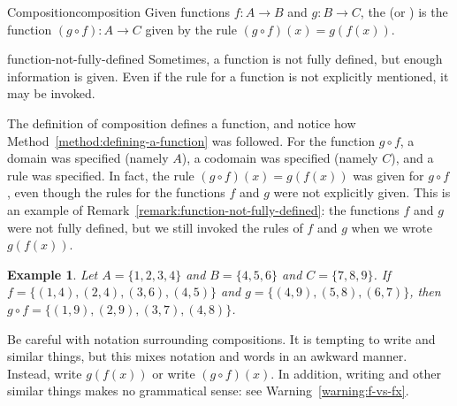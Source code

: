 \documentclass{book}
\newcounter{ekcounter}%
\theoremstyle{ekimcustom}
\newtheorem{example}[ekcounter]{Example}
\newcommand\defn[1]{{\color{blue}{\bf #1}}}
\begin{document}
\begin{bdefinition}{Composition}{composition}
Given functions $f : A \to B$ and $g: B \to C$, the \defn{composition} (or \defn{composite function}) is the function $(g \circ f): A \to C$ given by the rule $(g \circ f)(x) = g(f(x))$.
\end{bdefinition}
\begin{bremark}{}{function-not-fully-defined}
Sometimes, a function is not fully defined, but enough information is given. Even if the rule for a function is not explicitly mentioned, it may be invoked.
\end{bremark}
The definition of composition defines a function, and notice how Method~\ref{method:defining-a-function} was followed. For the function $g \circ f$, a domain was specified (namely $A$), a codomain was specified (namely $C$), and a rule was specified. In fact, the rule $(g \circ f)(x) = g(f(x))$ was given for $g \circ f$, even though the rules for the functions $f$ and $g$ were not explicitly given. This is an example of Remark~\ref{remark:function-not-fully-defined}: the functions $f$ and $g$ were not fully defined, but we still invoked the rules of $f$ and $g$ when we wrote $g(f(x))$.
\begin{example}
Let $A = \{1,2,3,4\}$ and $B = \{4,5,6\}$ and $C = \{7,8,9\}$. If $f = \{(1,4), (2,4), (3,6), (4,5)\}$ and $g = \{(4,9),(5,8),(6,7)\}$, then $g \circ f = \{(1,9), (2,9), (3,7), (4,8)\}$.
\end{example}
\begin{bwarning}{}{}
Be careful with notation surrounding compositions. It is tempting to write  and similar things, but this mixes notation and words in an awkward manner. Instead, write $g(f(x))$ or write $(g \circ f)(x)$. In addition, writing  and other similar things makes no grammatical sense: see Warning~\ref{warning:f-vs-fx}.
\end{bwarning}
\end{document}
